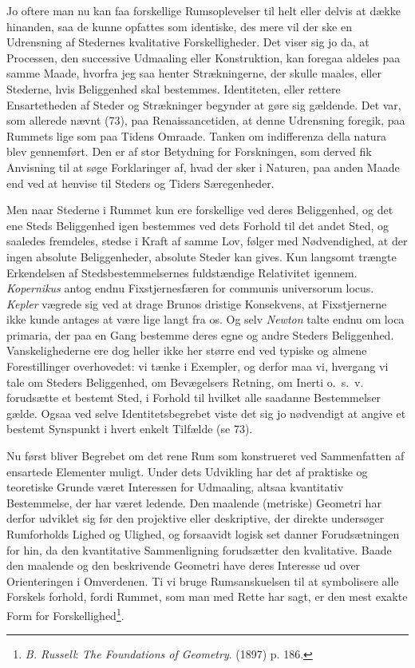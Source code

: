 \documentclass[12pt,a4paper]{book}
\newcommand{\opage}[1]{\marginnote{\footnotesize\textit{[#1]}}}
\begin{document}
Jo oftere man nu kan faa forskellige Rumsoplevelser til helt eller
delvis at dække hinanden, saa de kunne opfattes som identiske, des mere
vil der ske en Udrensning af Stedernes kvalitative Forskelligheder. Det
viser sig jo da, at Processen, den successive Udmaaling eller
Konstruktion, kan foregaa aldeles paa samme Maade, hvorfra jeg saa
henter Strækningerne, der skulle maales, eller Stederne, hvis
Beliggenhed skal bestemmes. Identiteten, eller rettere Ensartetheden af
Steder og Strækninger begynder at gøre sig gældende. Det var, som
allerede nævnt (73), paa Renaissancetiden, at denne Udrensning foregik,
paa Rummets lige\opage{199} som paa Tidens Omraade. Tanken om indifferenza della
natura blev gennemført. Den er af stor Betydning for Forskningen, som
derved fik Anvisning til at søge Forklaringer af, hvad der sker i
Naturen, paa anden Maade end ved at henvise til Steders og Tiders
Særegenheder.

Men naar Stederne i Rummet kun ere forskellige ved deres Beliggenhed, og
det ene Steds Beliggenhed igen bestemmes ved dets Forhold til det andet
Sted, og saaledes fremdeles, stedse i Kraft af samme Lov, følger med
Nødvendighed, at der ingen absolute Beliggenheder, absolute Steder kan
gives. Kun langsomt trængte Erkendelsen af Stedsbestemmelsernes
fuldstændige Relativitet igennem. \emph{Kopernikus} antog endnu
Fixstjernesfæren for communis universorum locus. \emph{Kepler} vægrede
sig ved at drage Brunos dristige Konsekvens, at Fixstjernerne ikke kunde
antages at være lige langt fra os. Og selv \emph{Newton} talte endnu om
loca primaria, der paa en Gang bestemme deres egne og andre Steders
Beliggenhed. Vanskelighederne ere dog heller ikke her større end ved
typiske og almene Forestillinger overhovedet: vi tænke i Exempler, og
derfor maa vi, hvergang vi tale om Steders Beliggenhed, om Bevægelsers
Retning, om Inerti o.\ s.\ v. forudsætte et bestemt Sted, i Forhold til
hvilket alle saadanne Bestemmelser gælde. Ogsaa ved selve
Identitetsbegrebet viste det sig jo nødvendigt at angive et bestemt
Synspunkt i hvert enkelt Tilfælde (se 73).

Nu først bliver Begrebet om det rene Rum som konstrueret ved
Sammenfatten af ensartede Elementer muligt. Under dets Udvikling har det
af praktiske og teoretiske Grunde været Interessen for Udmaaling,
altsaa kvantitativ Bestemmelse, der har været ledende. Den maalende
(metriske) Geometri har derfor udviklet sig før den projektive eller
deskriptive, der direkte undersøger Rumforholds Lighed og Ulighed, og
forsaavidt logisk set danner Forudsætningen for hin, da den kvantitative
Sammenligning forudsætter den kvalitative. Baade den maalende og den
beskrivende Geometri have deres Interesse ud over Orienteringen i
Omverdenen. Ti vi bruge Rumsanskuelsen til at symbolisere alle
Forskels%
\opage{200}forhold, fordi Rummet, som man med Rette har sagt, er den mest
exakte Form for Forskellighed\footnote{\emph{B. Russell}: \emph{The
Foundations of Geometry}. (1897) p. 186.}.
\end{document}
